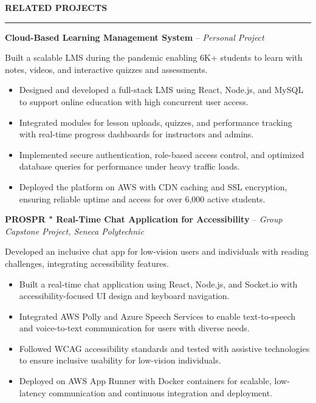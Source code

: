 \documentclass[10pt,letterpaper]{article}
\begin{document}
\vspace{6pt}

\textbf{RELATED PROJECTS}\\[-8pt]
\noindent\rule{\textwidth}{1pt}

\vspace{-2pt}

\textbf{Cloud-Based Learning Management System} -- \emph{Personal Project}

\vspace{-1pt}

Built a scalable LMS during the pandemic enabling 6K+ students to learn with notes, videos, and interactive quizzes and assessments.
\vspace{-1pt}
\begin{itemize}
\item Designed and developed a full-stack LMS using React, Node.js, and MySQL to support online education with high concurrent user access.
\item Integrated modules for lesson uploads, quizzes, and performance tracking with real-time progress dashboards for instructors and admins.
\item Implemented secure authentication, role-based access control, and optimized database queries for performance under heavy traffic loads.
\item Deployed the platform on AWS with CDN caching and SSL encryption, ensuring reliable uptime and access for over 6,000 active students.
\end{itemize}

\textbf{PROSPR " Real-Time Chat Application for Accessibility} -- \emph{Group Capstone Project, Seneca Polytechnic}

\vspace{-1pt}

Developed an inclusive chat app for low-vision users and individuals with reading challenges, integrating accessibility features.
\vspace{-1pt}
\begin{itemize}
\item Built a real-time chat application using React, Node.js, and Socket.io with accessibility-focused UI design and keyboard navigation.
\item Integrated AWS Polly and Azure Speech Services to enable text-to-speech and voice-to-text communication for users with diverse needs.
\item Followed WCAG accessibility standards and tested with assistive technologies to ensure inclusive usability for low-vision individuals.
\item Deployed on AWS App Runner with Docker containers for scalable, low-latency communication and continuous integration and deployment.
\end{itemize}
\end{document}
